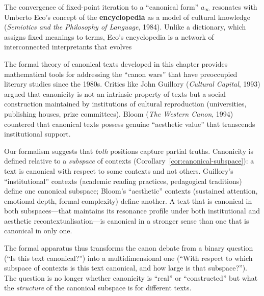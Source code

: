 \begin{interpretation}
\label{interp:ch10:eco_encyclopedia}
The convergence of fixed-point iteration to a ``canonical form'' $a_\infty$
resonates with Umberto Eco's concept of the \textbf{encyclopedia} as a model
of cultural knowledge (\emph{Semiotics and the Philosophy of Language},
1984).  Unlike a dictionary, which assigns fixed meanings to terms, Eco's
encyclopedia is a network of interconnected interpretants that evolves

\begin{interpretation}
\label{interp:ch10:canon_wars}
The formal theory of canonical texts developed in this chapter provides
mathematical tools for addressing the ``canon wars'' that have preoccupied
literary studies since the 1980s.  Critics like John Guillory (\emph{Cultural
Capital}, 1993) argued that canonicity is not an intrinsic property of texts
but a social construction maintained by institutions of cultural reproduction
(universities, publishing houses, prize committees).  Bloom (\emph{The Western
Canon}, 1994) countered that canonical texts possess genuine ``aesthetic
value'' that transcends institutional support.

Our formalism suggests that \emph{both} positions capture partial truths.
Canonicity is defined relative to a \emph{subspace} of contexts
(Corollary~\ref{cor:canonical-subspace}): a text is canonical with respect
to some contexts and not others.  Guillory's ``institutional'' contexts
(academic reading practices, pedagogical traditions) define one canonical
subspace; Bloom's ``aesthetic'' contexts (sustained attention, emotional
depth, formal complexity) define another.  A text that is canonical in both
subspaces---that maintains its resonance profile under both institutional
and aesthetic recontextualisation---is canonical in a stronger sense than
one that is canonical in only one.

The formal apparatus thus transforms the canon debate from a binary question
(``Is this text canonical?'') into a multidimensional one (``With respect to
which subspace of contexts is this text canonical, and how large is that
subspace?'').  The question is no longer whether canonicity is ``real'' or
``constructed'' but what the \emph{structure} of the canonical subspace is
for different texts.
\end{interpretation}




\end{interpretation}
